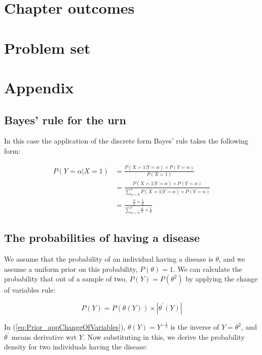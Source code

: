 \documentclass[11pt,fullpage]{book}
\begin{document}
\section{Chapter outcomes}

\section{Problem set}

\section{Appendix}
\subsection{Bayes' rule for the urn}\label{app:Prior_bayesUrn}
In this case the application of the discrete form Bayes' rule takes the following form:

\begin{equation}\label{eq:Prior_bayesDiscreteForm}
\begin{align}
P(Y=\alpha|X=1) &= \frac{P(X=1|Y=\alpha)\times P(Y=\alpha)}{P(X=1)}\\
&= \frac{P(X=1|Y=\alpha)\times P(Y=\alpha)}{\sum\limits_{\alpha=0}^{5}P(X=1|Y=\alpha)\times P(Y=\alpha)}\\
&= \frac{\frac{\alpha}{5}\times \frac{1}{6}}{\sum\limits_{\alpha=0}^{5}\frac{\alpha}{5}\times\frac{1}{6}}
\end{align}
\end{equation}

\subsection{The probabilities of having a disease}\label{app:Prior_diseaseJeffreys}
We assume that the probability of an individual having a disease is $\theta$, and we assume a uniform prior on this probability, $P(\theta)=1$. We can calculate the probability that out of a sample of two, $P(Y)=P(\theta^2)$ by applying the change of variables rule:

\begin{equation}\label{eq:Prior_appChangeOfVariables}
P(Y) = P(\theta(Y))\times |\theta^\prime(Y)|
\end{equation}

In (\ref{eq:Prior_appChangeOfVariables}), $\theta(Y)=Y^{-\frac{1}{2}}$ is the inverse of $Y=\theta^2$, and $\theta^\prime$ means derivative wrt $Y$. Now substituting in this, we derive the probability density for two individuals having the disease:
\end{document}
